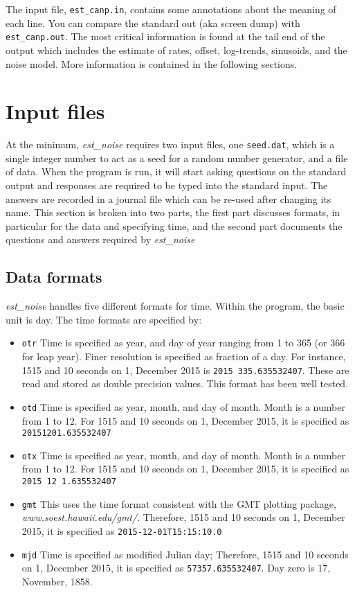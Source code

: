 \documentclass[12pt]{amsart}
\begin{document}
The input file, \texttt{est\_canp.in}, contains some annotations about the meaning of each line.  You can compare
the standard out (aka screen dump) with \texttt{est\_canp.out}.  The most critical information is found at the tail
end of the output which includes the estimate of rates, offset, log-trends, sinusoids, and the noise model.  More information
is contained in the following sections.

\section{Input files}

At the minimum, \textit{est\_noise} requires two input files, one \texttt{seed.dat}, which is a single integer number
to act as a seed for a random number generator, and a file of data.  When the program is run, it will start
asking questions on the standard output and responses are required to be typed into the
standard input. The answers are recorded in a journal file which
can be re-used after changing its name. This section is broken into two parts, the first part discusses formats, in particular
for the data and specifying time, and the second part documents the questions and answers required by
\textit{est\_noise}

\subsection{Data formats}

\textit{est\_noise} handles five different formats for time.  Within the program, the basic unit is day.  The time formats
are specified by:
\begin{itemize}
\item \texttt{otr} Time is specified as year, and day of year ranging from 1 to 365 (or 366 for leap year). Finer resolution
is specified as fraction of a day.  For instance, 1515 and 10 seconds on 1, December 2015 is \texttt{2015 335.635532407}. These are read and stored as double precision values. This format has been well tested.
\item \texttt{otd} Time is specified as year, month, and day of month.  Month is a number from 1 to 12. For 
1515 and 10 seconds on 1, December 2015, it is specified as \texttt{20151201.635532407}
\item \texttt{otx} Time is specified as year, month, and day of month.  Month is a number from 1 to 12. For 
1515 and 10 seconds on 1, December 2015, it is specified as \texttt{2015 12 1.635532407}
\item \texttt{gmt} This uses the time format consistent with the GMT plotting package, \textit{www.soest.hawaii.edu/gmt/}.
Therefore, 1515 and 10 seconds on 1, December 2015, it is specified as \texttt{2015-12-01T15:15:10.0}
\item \texttt{mjd} Time is specified as modified Julian day; Therefore, 1515 and 10 seconds on 1, December 2015, it is specified as \texttt{57357.635532407}. Day zero is 17, November, 1858.
\end{itemize}
\end{document}

